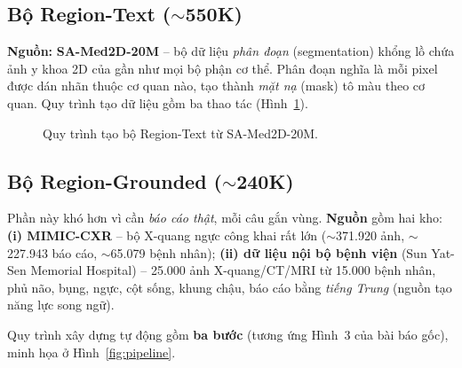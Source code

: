 \documentclass[12pt,a4paper,oneside]{extarticle}
\newcommand{\fact}[1]{#1}
\newcommand{\important}[1]{\textbf{#1}}
\begin{document}
\subsection{Bộ Region-Text ($\sim$550K)}
\fact{\textbf{Nguồn:} \textbf{SA-Med2D-20M} -- bộ dữ liệu \emph{phân đoạn} (segmentation) khổng
lồ chứa ảnh y khoa 2D của gần như mọi bộ phận cơ thể. Phân đoạn nghĩa là mỗi pixel được dán nhãn
thuộc cơ quan nào, tạo thành \emph{mặt nạ} (mask) tô màu theo cơ quan. Quy trình tạo dữ liệu gồm
ba thao tác (Hình~\ref{fig:regiontext}).}

\begin{figure}[H]
\centering
{}
\caption{Quy trình tạo bộ Region-Text từ SA-Med2D-20M.}
\label{fig:regiontext}
\end{figure}

\subsection{Bộ Region-Grounded ($\sim$240K)}
\fact{Phần này khó hơn vì cần \emph{báo cáo thật}, mỗi câu gắn vùng. \textbf{Nguồn} gồm hai kho:
\textbf{(i) MIMIC-CXR} -- bộ X-quang ngực công khai rất lớn ($\sim$371.920 ảnh, $\sim$227.943 báo
cáo, $\sim$65.079 bệnh nhân); \textbf{(ii) dữ liệu nội bộ bệnh viện} (Sun Yat-Sen Memorial
Hospital) -- 25.000 ảnh X-quang/CT/MRI từ 15.000 bệnh nhân, phủ não, bụng, ngực, cột sống, khung
chậu, báo cáo bằng \emph{tiếng Trung} (nguồn tạo năng lực song ngữ).}

\fact{Quy trình xây dựng tự động gồm \important{ba bước} (tương ứng Hình~3 của bài báo gốc), minh
họa ở Hình~\ref{fig:pipeline}.}
\end{document}
